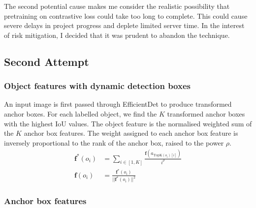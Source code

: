 \documentclass[12pt,a4paper,twoside,openright]{report}
\begin{document}
The second potential cause makes me consider the realistic possibility that pretraining on contrastive loss could take too long to complete. This could cause severe delays in project progress and deplete limited server time. In the interest of risk mitigation, I decided that it was prudent to abandon the technique.

\subsection{Second Attempt}

\subsubsection{Object features with dynamic detection boxes}
An input image is first passed through EfficientDet to produce transformed anchor boxes. For each labelled object, we find the $K$ transformed anchor boxes with the highest IoU values. The object feature is the normalised weighted sum of the $K$ anchor box features. The weight assigned to each anchor box feature is inversely proportional to the rank of the anchor box, raised to the power $\rho$. 
\begin{align}
    \bm{f}^*(o_i) &= \sum\limits_{i\in [1,K]}\frac{\bm{f}(a_{\text{TopK}(o_i)[i]})}{i^\rho}\\
    \bm{f}(o_i) &= \frac{\bm{f}^*(o_i)}{||\bm{f}^*(o_i)||^2}
\end{align}


\subsubsection{Anchor box features}
\end{document}
